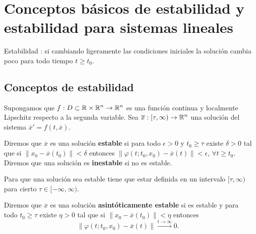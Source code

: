 \chapter{Conceptos básicos de estabilidad y estabilidad para sistemas lineales}
Estabilidad : si cambiando ligeramente las condiciones iniciales la solución cambia poco para todo tiempo $\displaystyle t \geq t_{0} $. 
\section{Conceptos de estabilidad}
Supongamos que $\displaystyle f : D \subset \mathbb{R} \times \mathbb{R}^{n} \to \mathbb{R}^{n} $ es una función continua y localmente Lipschitz respecto a la segunda variable. Sea $\displaystyle \overline{x} : [\tau, \infty) \to \mathbb{R}^{n} $ una solución del sistema $\displaystyle \overline{x}' = f\left(t, \overline{x}\right) $. 
\begin{definition}[Estabilidad]
Diremos que $\displaystyle \overline{x} $ es una solución \textbf{estable} si para todo $\displaystyle \epsilon > 0 $ y $\displaystyle t_{0}\geq \tau $ existe $\displaystyle \delta > 0 $ tal que si $\displaystyle \|x_{0}-\overline{x}\left(t_{0}\right)\| < \delta  $ entonces $\displaystyle \|\varphi\left(t; t_{0}, x_{0}\right)-\overline{x}\left(t\right)\| < \epsilon  $, $\displaystyle \forall t \geq t_{0} $. Diremos que una solución es \textbf{inestable} si no es estable.  
\end{definition}
\begin{observation}
Para que una solución sea estable tiene que estar definida en un intervalo $\displaystyle [\tau, \infty )$ para cierto $\displaystyle \tau \in [-\infty, \infty) $. 
\end{observation}
\begin{definition}
Diremos que $\displaystyle \overline{x} $ es una solución \textbf{asintóticamente estable} si es estable y para todo $\displaystyle t_{0}\geq \tau $ existe $\displaystyle \eta > 0 $ tal que si $\displaystyle \left\|x_{0}-\overline{x}\left(t_{0}\right)\right\|<\eta  $ entonces
\[ \left\|\varphi\left(t; t_{0}, x_{0}\right)-\overline{x}\left(t\right)\right\|\xrightarrow{t \to \infty} 0 .\]
\end{definition}
